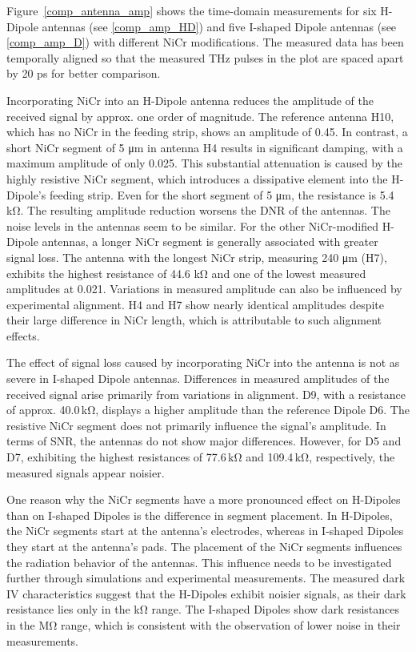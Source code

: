 Figure~\ref{comp_antenna_amp} shows the time-domain measurements for six H-Dipole antennas (see \ref{comp_amp_HD}) and five I-shaped Dipole antennas (see \ref{comp_amp_D}) with different NiCr modifications. The measured data has been temporally aligned so that the measured THz pulses in the plot are spaced apart by \num{20} \si{\pico \s} for better comparison.  

Incorporating NiCr into an H-Dipole antenna reduces the amplitude of the received signal by approx. one order of magnitude. The reference antenna H10, which has no NiCr in the feeding strip, shows an amplitude of \num{0.45}. In contrast, a short NiCr segment of \num{5} \si{\micro\meter} in antenna H4 results in significant damping, with a maximum amplitude of only \num{0.025}. This substantial attenuation is caused by the highly resistive NiCr segment, which introduces a dissipative element into the H-Dipole’s feeding strip. Even for the short segment of \num{5} \si{\micro \meter}, the resistance is \num{5.4} \si{\kilo \ohm}. The resulting amplitude reduction worsens the DNR of the antennas. The noise levels in the antennas seem to be similar. For the other NiCr-modified H-Dipole antennas, a longer NiCr segment is generally associated with greater signal loss. The antenna with the longest NiCr strip, measuring \num{240} \si{\micro\meter} (H7), exhibits the highest resistance of \num{44.6} \si{\kilo\ohm} and one of the lowest measured amplitudes at \num{0.021}. Variations in measured amplitude can also be influenced by experimental alignment. H4 and H7 show nearly identical amplitudes despite their large difference in NiCr length, which is attributable to such alignment effects.

The effect of signal loss caused by incorporating NiCr into the antenna is not as severe in I-shaped Dipole antennas. Differences in measured amplitudes of the received signal arise primarily from variations in alignment. D9, with a resistance of approx. \num{40.0}\,\si{\kilo \ohm}, displays a higher amplitude than the reference Dipole D6. The resistive NiCr segment does not primarily influence the signal's amplitude. In terms of SNR, the antennas do not show major differences. However, for D5 and D7, exhibiting the highest resistances of \num{77.6}\,\si{\kilo \ohm} and \num{109.4}\,\si{\kilo \ohm}, respectively, the measured signals appear noisier. 

One reason why the NiCr segments have a more pronounced effect on H-Dipoles than on I-shaped Dipoles is the difference in segment placement. In H-Dipoles, the NiCr segments start at the antenna’s electrodes, whereas in I-shaped Dipoles they start at the antenna’s pads. The placement of the NiCr segments influences the radiation behavior of the antennas. This influence needs to be investigated further through simulations and experimental measurements. The measured dark IV characteristics suggest that the H-Dipoles exhibit noisier signals, as their dark resistance lies only in the \si{\kilo \ohm} range. The I-shaped Dipoles show dark resistances in the \si{\mega \ohm} range, which is consistent with the observation of lower noise in their measurements.


